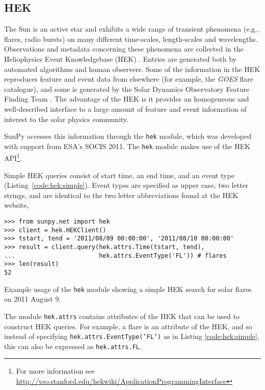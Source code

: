 \subsection{HEK}\label{ssec:hek}

The Sun is an active star and exhibits a wide range of transient phenomena 
(e.g., flares, radio bursts) on many different time-scales, length-scales and 
wavelengths. Observations and metadata concerning these phenomena are collected 
in the Heliophysics Event Knowledgebase (HEK) \citep{hek2012}.  Entries are generated both by 
automated algorithms and human observers.  Some of the information in the HEK 
reproduces feature and event data from elsewhere (for example, the \textit{GOES} flare catalogue),
and some is generated by the Solar Dynamics Observatory Feature Finding Team 
\citep{martens2012}.  The advantage of the HEK is it 
provides an homogeneous and well-described interface to a large amount of 
feature and event information of interest to the solar physics community.

SunPy accesses this information through the \texttt{hek} module, which was
developed with support from ESA's SOCIS 2011.  The \texttt{hek} module makes 
use of the 
HEK API\footnote{For more information see 
\href{http://vso.stanford.edu/hekwiki/ApplicationProgrammingInterface}{http://vso.stanford.edu/hekwiki/ApplicationProgrammingInterface}}.

Simple HEK queries consist of start time, an end time, and an event type 
(Listing~\ref{code:hek:simple}). Event types are specified as upper case, 
two letter strings, and are 
identical to the two letter abbreviations found at the HEK website,

\begin{listing}[H]
\begin{verbatim}
>>> from sunpy.net import hek
>>> client = hek.HEKClient()
>>> tstart, tend = '2011/08/09 00:00:00', '2011/08/10 00:00:00'
>>> result = client.query(hek.attrs.Time(tstart, tend), 
...                       hek.attrs.EventType('FL')) # flares
>>> len(result)
52
\end{verbatim}
\caption{Example usage of the \texttt{hek} module showing a simple HEK search for solar flares
on 2011 August 9.}
\label{code:hek:simple}
\end{listing}

The module \texttt{hek.attrs} contains attributes of the HEK that can be used to
construct HEK queries.  For example, a flare is an attribute of the HEK, and so 
instead of specifying \texttt{hek.attrs.EventType('FL')} as in Listing 
\ref{code:hek:simple}, this can also be expressed as \texttt{hek.attrs.FL}. 

